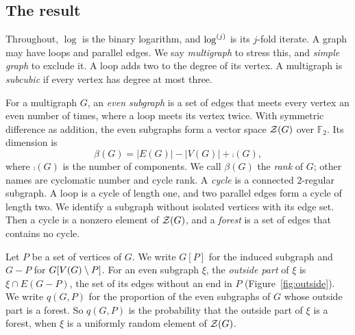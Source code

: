\documentclass[11pt]{article}
\begin{document}
\subsection{The result}

Throughout, $\log$ is the binary logarithm, and $\log^{(j)}$ is its $j$-fold iterate. A graph may
have loops and parallel edges. We say \emph{multigraph} to stress this, and \emph{simple graph}
to exclude it. A loop adds two to the degree of its vertex. A multigraph is \emph{subcubic} if
every vertex has degree at most three.

For a multigraph $G$, an \emph{even subgraph} is a set of edges that meets every vertex an even
number of times, where a loop meets its vertex twice. With symmetric difference as addition, the
even subgraphs form a vector space $\mathcal{Z}(G)$ over $\mathbb{F}_2$. Its dimension is
\[
  \beta(G)=|E(G)|-|V(G)|+\comp(G),
\]
where $\comp(G)$ is the number of components. We call $\beta(G)$ the \emph{rank} of $G$; other
names are cyclomatic number and cycle rank. A \emph{cycle} is a connected $2$-regular subgraph.
A loop is a cycle of length one, and two parallel edges form a cycle of length two. We identify a
subgraph without isolated vertices with its edge set. Then a cycle is a nonzero element of
$\mathcal{Z}(G)$, and a \emph{forest} is a set of edges that contains no cycle.

Let $P$ be a set of vertices of $G$. We write $G[P]$ for the induced subgraph and $G-P$ for
$G[V(G)\setminus P]$. For an even subgraph $\xi$, the \emph{outside part} of $\xi$ is
$\xi\cap E(G-P)$, the set of its edges without an end in $P$ (Figure~\ref{fig:outside}). We
write $q(G,P)$ for the proportion of the even subgraphs of $G$ whose outside part is a forest.
So $q(G,P)$ is the probability that the outside part of $\xi$ is a forest, when $\xi$ is a
uniformly random element of $\mathcal{Z}(G)$.
\end{document}
